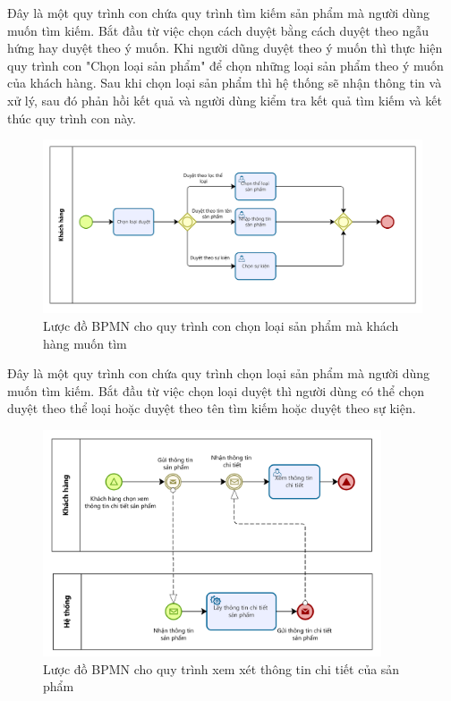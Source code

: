 Đây là một quy trình con chứa quy trình tìm kiếm sản phẩm mà người dùng muốn tìm kiếm. Bắt đầu từ việc chọn cách duyệt bằng cách duyệt theo ngẫu hứng hay duyệt theo ý muốn. Khi người dũng duyệt theo ý muốn thì thực hiện quy trình con "Chọn loại sản phẩm" để chọn những loại sản phẩm theo ý muốn của khách hàng. Sau khi chọn loại sản phẩm thì hệ thống sẽ nhận thông tin và xử lý, sau đó phản hồi kết quả và người dùng kiểm tra kết quả tìm kiếm và kết thúc quy trình con này.
 
\newpage
\begin{figure}[!htp]
    \centering
    \includegraphics[width=12cm]{img/BPMN/customer_buy/customer_select_type.png}
    \newline
    \caption{Lược đồ BPMN cho quy trình con chọn loại sản phẩm mà khách hàng muốn tìm}
\end{figure}
 
Đây là một quy trình con chứa quy trình chọn loại sản phẩm mà người dùng muốn tìm kiếm. Bắt đầu từ việc chọn loại duyệt thì người dùng có thể chọn duyệt theo thể loại hoặc duyệt theo tên tìm kiếm hoặc duyệt theo sự kiện.

 
\begin{figure}[!htp]
    \centering
    \includegraphics[width=10cm]{img/BPMN/customer_buy/customer_product_detail.png}
    \newline
    \caption{Lược đồ BPMN cho quy trình xem xét thông tin chi tiết của sản phẩm}
\end{figure}
 
